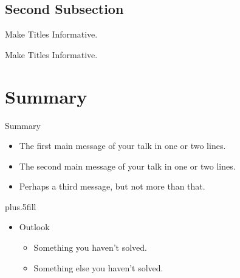 \documentclass[t]{beamer}
\begin{document}
\subsection{Second Subsection}

\begin{frame}{Make Titles Informative.}
\end{frame}

\begin{frame}{Make Titles Informative.}
\end{frame}



\section*{Summary}

\begin{frame}{Summary}

    \begin{itemize}
	\item
	    The \alert{first main message} of your talk in one or two lines.
	\item
	    The \alert{second main message} of your talk in one or two lines.
	\item
	    Perhaps a \alert{third message}, but not more than that.
    \end{itemize}

    \vskip0pt plus.5fill
    \begin{itemize}
	\item
	    Outlook
	    \begin{itemize}
		\item
		    Something you haven't solved.
		\item
		    Something else you haven't solved.
	    \end{itemize}
    \end{itemize}
\end{frame}
\end{document}
